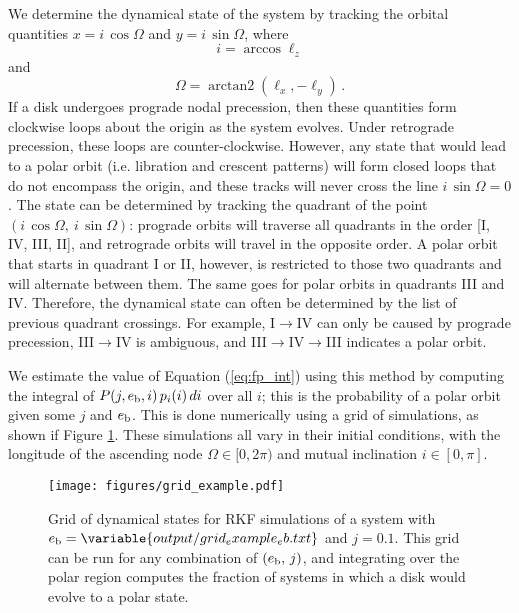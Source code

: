 \documentclass[twocolumn]{aastex631}
\DeclareMathOperator{\arctantwo}{arctan2}
\begin{document}
We determine the dynamical state of the system by tracking the orbital quantities $x=i\,\cos{\Omega}$ and $y=i\,\sin{\Omega}$, where
\begin{equation}
    i = \arccos{\ell_z}
    \label{eq:inclination}
\end{equation}
and
\begin{equation}
    \Omega = \arctantwo (\ell_x, -\ell_y)\, .
    \label{eq:omega}
\end{equation}
If a disk undergoes prograde nodal precession, then these quantities form clockwise loops about the origin as the system evolves. Under retrograde precession, these loops are counter-clockwise. However, any state that would lead to a polar orbit (i.e. libration and crescent patterns) will form closed loops that do not encompass the origin, and these tracks will never cross the line $i\,\sin{\Omega}=0$. The state can be determined by tracking the quadrant of the point $(i\,\cos{\Omega},~i\,\sin{\Omega})$: prograde orbits will traverse all quadrants in the order [I, IV, III, II], and retrograde orbits will travel in the opposite order. A polar orbit that starts in quadrant I or II, however, is restricted to those two quadrants and will alternate between them. The same goes for polar orbits in quadrants III and IV. Therefore, the dynamical state can often be determined by the list of previous quadrant crossings. For example, I$\rightarrow$IV can only be caused by prograde precession, III$\rightarrow$IV is ambiguous, and III$\rightarrow$IV$\rightarrow$III indicates a polar orbit.

We estimate the value of Equation (\ref{eq:fp_int}) using this method by computing the integral of $P(j,e_{\rm b},i)\,p_i(i)\,di$ over all $i$; this is the probability of a polar orbit given some $j$ and $e_{\rm b}$. This is done numerically using a grid of simulations, as shown if Figure \ref{fig:grid_example}. These simulations all vary in their initial conditions, with the longitude of the ascending node $\Omega \in [0,2\pi)$ and mutual inclination $i \in [0,\pi]$.

\begin{figure}
    \begin{centering}
        \texttt{[image: figures/grid\_example.pdf]}
    \end{centering}
    \caption{
        Grid of dynamical states for  RKF simulations of a system with $e_{\rm b}=\variable{output/grid_example_eb.txt}$ and $j=0.1$. This grid can be run for any combination of $(e_{\rm b},\,j)$, and integrating over the polar region computes the fraction of systems in which a disk would evolve to a polar state.
    }
    \label{fig:grid_example}
\end{figure}
\end{document}
